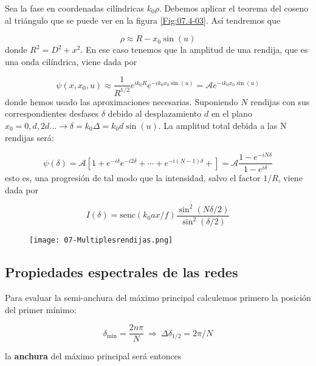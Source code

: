 \documentclass[12pt,a4paper]{book}
\numberwithin{equation}{section}
\numberwithin{figure}{section}
\newcommand{\ccorchetes}[1]{\left[ #1  \right]}
\newcommand{\1}{_{(1)}}
\newcommand{\2}{_{(2)}}
\newcommand{\sinc}{\mathrm{senc} }
\theoremstyle{definition}
\begin{document}
Sea la fase en coordenadas cilíndricas $k_0\rho$. Debemos aplicar el teorema del coseno al triángulo que se puede ver en la figura \ref{Fig:07.4-03}. Así tendremos que

\begin{equation}
    \rho \approx R - x_0 \sin (u) 
\end{equation}
donde $R^2=D^2+x^2$. En ese caso tenemos que la amplitud de una rendija, que es una onda cilíndrica, viene dada por 

\begin{equation}
    \psi (x,x_0,u) \approx \frac{1}{R^{1/2}} e^{ik_0 R} e^{-ik_0 x_0 \sin (u)} = \mathcal{A} e^{-ik_0 x_0 \sin (u)}
\end{equation}
donde hemos usado las aproximaciones necesarias. Suponiendo $N$ rendijas con sus correspondientes desfases $\delta$ debido al desplazamiento $d$ en el plano $x_0=0,d,2d\ldots \rightarrow \delta = k_0 \Delta = k_0 d \sin (u)$. La amplitud total debida a las N rendijas será:

\begin{equation}
    \psi  (\delta) = \mathcal{A} \ccorchetes{1+e^{-i\delta}e^{-i2\delta}+\cdots+e^{-i(N-1)\delta}+} = \mathcal{A} \frac{1-e^{-iN\delta}}{1-e^{i\delta}}
\end{equation}
esto es, una progresión de tal modo que la intensidad, salvo el factor $1/R$, viene dada por

\begin{equation}
    I (\delta ) = \sinc(k_0 a x /f) \frac{\sin^2(N\delta  /2)}{\sin^2(\delta/2)}
\end{equation}

\begin{figure}[h!]
    \centering
    \texttt{[image: 07-Multiplesrendijas.png]}
    \caption{}
    \label{Fig:07.4-05}
\end{figure}


\subsection{Propiedades espectrales de las redes}

Para evaluar la semi-anchura del máximo principal calculemos primero la posición del primer mínimo:

\begin{equation}
    \delta_{\min} = \frac{2n \pi}{N} \ \Rightarrow \ \Delta \delta_{1/2} = 2 \pi / N   
\end{equation}

la \textbf{anchura} del máximo principal será entonces
\end{document}
